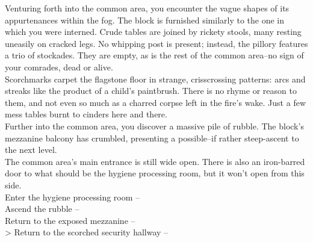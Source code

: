 Venturing forth into the common area, you encounter the vague shapes of its appurtenances within the fog. The block is furnished similarly to the one in which you were interned. Crude tables are joined by rickety stools, many resting uneasily on cracked legs. No whipping post is present; instead, the pillory features a trio of stockades. They are empty, as is the rest of the common area--no sign of your comrades, dead or alive.\\

Scorchmarks carpet the flagstone floor in strange, crisscrossing patterns: arcs and streaks like the product of a child’s paintbrush. There is no rhyme or reason to them, and not even so much as a charred corpse left in the fire’s wake. Just a few mess tables burnt to cinders here and there.\\

Further into the common area, you discover a massive pile of rubble. The block's mezzanine balcony has crumbled, presenting a possible--if rather steep-ascent to the next level.\\

The common area's main entrance is still wide open. There is also an iron-barred door to what should be the hygiene processing room, but it won’t open from this side.\\

 Enter the hygiene processing room -- \\
 Ascend the rubble -- \\
 Return to the exposed mezzanine -- \\
> Return to the scorched security hallway -- 